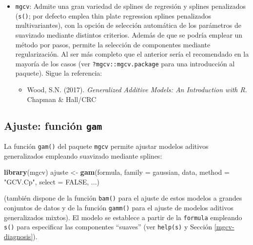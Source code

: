 \documentclass[
]{book}
\newenvironment{Shaded}{\begin{snugshade}}{\end{snugshade}}
\newcommand{\DataTypeTok}[1]{\textcolor[rgb]{0.13,0.29,0.53}{#1}}
\newcommand{\KeywordTok}[1]{\textcolor[rgb]{0.13,0.29,0.53}{\textbf{#1}}}
\newcommand{\NormalTok}[1]{#1}
\newcommand{\OtherTok}[1]{\textcolor[rgb]{0.56,0.35,0.01}{#1}}
\newcommand{\StringTok}[1]{\textcolor[rgb]{0.31,0.60,0.02}{#1}}
\providecommand{\tightlist}{%
  \setlength{\itemsep}{0pt}\setlength{\parskip}{0pt}}
\theoremstyle{break}
\theoremstyle{definition}
\theoremstyle{definition}
\theoremstyle{definition}
\theoremstyle{remark}
\begin{document}
\vspace{0.5cm}

\begin{itemize}
\item
  \texttt{mgcv}: Admite una gran variedad de splines de regresión y splines penalizados (\texttt{s()}; por defecto emplea thin plate regression splines penalizados multivariantes), con la opción de selección automática de los parámetros de suavizado mediante distintos criterios.
  Además de que se podría emplear un método por pasos, permite la selección de componentes mediante regularización.
  Al ser más completo que el anterior sería el recomendado en la mayoría de los casos (ver \texttt{?mgcv::mgcv.package} para una introducción al paquete).
  Sigue la referencia:

  \begin{itemize}
  \tightlist
  \item
    Wood, S.N. (2017). \emph{Generalized Additive Models: An Introduction with R}. Chapman \& Hall/CRC
  \end{itemize}
\end{itemize}

\vspace{0.5cm}

\hypertarget{ajuste-funciuxf3n-gam}{%
\subsection{\texorpdfstring{Ajuste: función \texttt{gam}}{Ajuste: función gam}}\label{ajuste-funciuxf3n-gam}}

La función \texttt{gam()} del paquete \texttt{mgcv} permite ajustar modelos aditivos generalizados empleando suavizado mediante splines:

\begin{Shaded}
\begin{Highlighting}[]
\KeywordTok{library}\NormalTok{(mgcv)}
\NormalTok{ajuste <-}\StringTok{ }\KeywordTok{gam}\NormalTok{(formula, }\DataTypeTok{family =}\NormalTok{ gaussian, data, }\DataTypeTok{method =} \StringTok{"GCV.Cp"}\NormalTok{, }\DataTypeTok{select =} \OtherTok{FALSE}\NormalTok{, ...)}
\end{Highlighting}
\end{Shaded}

(también dispone de la función \texttt{bam()} para el ajuste de estos modelos a grandes conjuntos de datos y de la función \texttt{gamm()} para el ajuste de modelos aditivos generalizados mixtos). El modelo se establece a partir de la \texttt{formula} empleando \texttt{s()} para especificar las componentes ``suaves'' (ver \texttt{help(s)} y Sección \ref{mgcv-diagnosis}).
\end{document}
